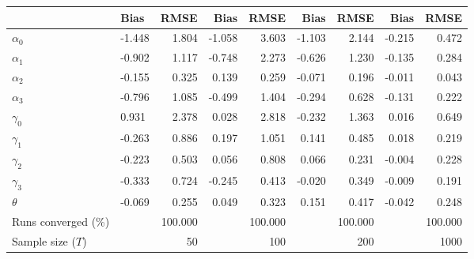 
\begin{tabular}[t]{llrrrrrrr}
\toprule
  & Bias & RMSE & Bias & RMSE & Bias & RMSE & Bias & RMSE\\
\midrule
$\alpha_{0}$ & -1.448 & 1.804 & -1.058 & 3.603 & -1.103 & 2.144 & -0.215 & 0.472\\
$\alpha_{1}$ & -0.902 & 1.117 & -0.748 & 2.273 & -0.626 & 1.230 & -0.135 & 0.284\\
$\alpha_{2}$ & -0.155 & 0.325 & 0.139 & 0.259 & -0.071 & 0.196 & -0.011 & 0.043\\
$\alpha_{3}$ & -0.796 & 1.085 & -0.499 & 1.404 & -0.294 & 0.628 & -0.131 & 0.222\\
$\gamma_{0}$ & 0.931 & 2.378 & 0.028 & 2.818 & -0.232 & 1.363 & 0.016 & 0.649\\
$\gamma_{1}$ & -0.263 & 0.886 & 0.197 & 1.051 & 0.141 & 0.485 & 0.018 & 0.219\\
$\gamma_{2}$ & -0.223 & 0.503 & 0.056 & 0.808 & 0.066 & 0.231 & -0.004 & 0.228\\
$\gamma_{3}$ & -0.333 & 0.724 & -0.245 & 0.413 & -0.020 & 0.349 & -0.009 & 0.191\\
$\theta$ & -0.069 & 0.255 & 0.049 & 0.323 & 0.151 & 0.417 & -0.042 & 0.248\\
Runs converged (\%) &  & 100.000 &  & 100.000 &  & 100.000 &  & 100.000\\
Sample size ($T$) &  & 50 &  & 100 &  & 200 &  & 1000\\
\bottomrule
\end{tabular}
